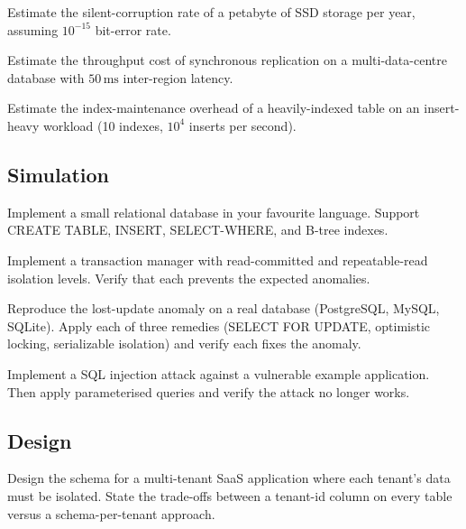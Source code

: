 \begin{exercise}
Estimate the silent-corruption rate of a petabyte of SSD storage per year, assuming $10^{-15}$ bit-error rate.
\end{exercise}

\begin{exercise}
Estimate the throughput cost of synchronous replication on a multi-data-centre database with $50\,\si{\milli\second}$ inter-region latency.
\end{exercise}

\begin{exercise}
Estimate the index-maintenance overhead of a heavily-indexed table on an insert-heavy workload (10 indexes, $10^4$ inserts per second).
\end{exercise}

\subsection*{Simulation}

\begin{exercise}
Implement a small relational database in your favourite language. Support CREATE TABLE, INSERT, SELECT-WHERE, and B-tree indexes.
\end{exercise}

\begin{exercise}
Implement a transaction manager with read-committed and repeatable-read isolation levels. Verify that each prevents the expected anomalies.
\end{exercise}

\begin{exercise}
Reproduce the lost-update anomaly on a real database (PostgreSQL, MySQL, SQLite). Apply each of three remedies (SELECT FOR UPDATE, optimistic locking, serializable isolation) and verify each fixes the anomaly.
\end{exercise}

\begin{exercise}
Implement a SQL injection attack against a vulnerable example application. Then apply parameterised queries and verify the attack no longer works.
\end{exercise}

\subsection*{Design}

\begin{exercise}
Design the schema for a multi-tenant SaaS application where each tenant's data must be isolated. State the trade-offs between a tenant-id column on every table versus a schema-per-tenant approach.
\end{exercise}

